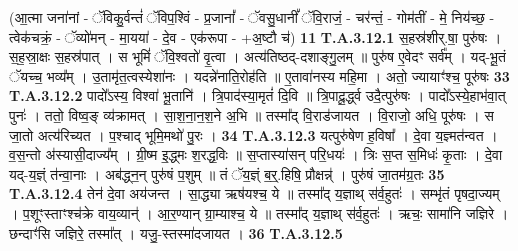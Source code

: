 \documentclass[17pt]{extarticle}
\begin{document}
                  \newline
                                                        (आ॒त्मा जना॑नां - ॅविकु॒र्वन्तं॑ ॅविप॒श्विं - प्र॒जानां᳚ - ॅवसु॒धानीं᳚  ॅवि॒राजं॒ - चर॑न्तं॒ - गोम॑तीं - मे॒ निय॑च्छ॒ - त्वेक॑चक्रं॒ - ॅव्यो॑मन् - मा॒यया॑ - दे॒व - एक॑रूपा - +अ॒ष्टौ च॑) \textbf{11} \newline \newline
                                \textbf{ T.A.3.12.1} \newline
                  स॒हस्र॑शीर्.षा॒ पुरु॑षः । स॒ह॒स्रा॒क्षः स॒हस्र॑पात् । स भूमिं॑ ॅवि॒श्वतो॑ वृ॒त्वा । अत्य॑तिष्ठद्-दशाङ्गु॒लम् ॥ पुरु॑ष ए॒वेदꣳ सर्व᳚म् । यद्-भू॒तं ॅयच्च॒ भव्य᳚म् ।  उ॒तामृ॑त॒त्वस्येशा॑नः । यदन्ने॑नाति॒रोह॑ति ॥ ए॒तावा॑नस्य महि॒मा । अतो॒ ज्यायाꣳ॑श्च॒ पूरु॑षः \textbf{ 33} \newline
                  \newline
                                                                  \textbf{ T.A.3.12.2} \newline
                  पादो᳚ऽस्य॒ विश्वा॑ भू॒तानि॑ । त्रि॒पाद॑स्या॒मृतं॑ दि॒वि ॥  त्रि॒पादू॒र्द्ध्व उदै॒त्पुरु॑षः । पादो᳚ऽस्ये॒हाभ॑वा॒त् पुनः॑ । ततो॒ विष्व॒ङ् व्य॑क्रामत् । सा॒श॒ना॒न॒श॒ने अ॒भि ॥ तस्मा᳚द् वि॒राड॑जायत । वि॒राजो॒ अधि॒ पूरु॑षः ।  स जा॒तो अत्य॑रिच्यत । प॒श्चाद् भूमि॒मथो॑ पु॒रः । \textbf{ 34} \newline
                  \newline
                                                                  \textbf{ T.A.3.12.3} \newline
                  यत्पुरु॑षेण ह॒विषा᳚ । दे॒वा य॒ज्ञ्मत॑न्वत । व॒स॒न्तो अ॑स्यासी॒दाज्य᳚म् । ग्री॒ष्म इ॒द्ध्मः श॒रद्ध॒विः ॥ स॒प्तास्या॑सन् परि॒धयः॑ ।  त्रिः स॒प्त स॒मिधः॑ कृ॒ताः । दे॒वा यद्-य॒ज्ञ्ं त॑न्वा॒नाः । अब॑द्ध्न॒न् पुरु॑षं प॒शुम् ॥ तं ॅय॒ज्ञ्ं ब॒र्॒.हिषि॒ प्रौक्षन्न्॑ ।  पुरु॑षं जा॒तम॑ग्र॒तः \textbf{ 35} \newline
                  \newline
                                                                  \textbf{ T.A.3.12.4} \newline
                  तेन॑ दे॒वा अय॑जन्त । सा॒द्ध्या ऋष॑यश्च॒ ये ॥  तस्मा᳚द् य॒ज्ञाथ् स॑र्व॒हुतः॑ । सम्भृ॑तं पृषदा॒ज्यम् । प॒शूꣳस्ताꣳश्च॑क्रे वाय॒व्यान्॑ ।  आ॒र॒ण्यान् ग्रा॒म्याश्च॒ ये ॥ तस्मा᳚द् य॒ज्ञाथ् स॑र्व॒हुतः॑ । ऋचः॒ सामा॑नि जज्ञिरे । छन्दाꣳ॑सि जज्ञिरे॒ तस्मा᳚त् । यजु॒-स्तस्मा॑दजायत । \textbf{ 36} \newline
                  \newline
                                                                  \textbf{ T.A.3.12.5} \newline
\end{document}
